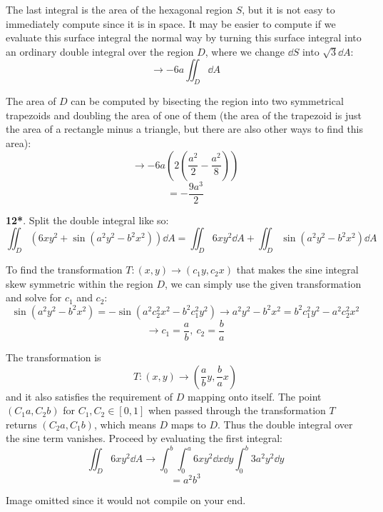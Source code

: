 \documentclass[11pt]{article}
\newcommand{\br}[1]{\left(#1\right)}
\newcommand{\sbr}[1]{\left[#1\right]}
\begin{document}
The last integral is the area of the hexagonal region $S$, but it is not easy to immediately compute since it is in space. It may be easier to compute if we evaluate this surface integral the normal way by turning this surface integral into an ordinary double integral over the region $D$, where we change $\dd{S}$ into $\sqrt{3}\dd{A}$:
$$\to -6a\iint_D\dd{A}$$

The area of $D$ can be computed by bisecting the region into two symmetrical trapezoids and doubling the area of one of them (the area of the trapezoid is just the area of a rectangle minus a triangle, but there are also other ways to find this area):
$$\to -6a\br{2\br{\frac{a^2}{2}-\frac{a^2}{8}}}$$
$$\boxed{=-\frac{9a^3}{2}}$$

\noindent\makebox[\linewidth]{\rule{19.1cm}{0.4pt}}

\textbf{12*}. Split the double integral like so:
$$\iint_D \br{6xy^2 + \sin(a^2y^2-b^2x^2)}\dd{A} = \iint_D 6xy^2\dd{A} + \iint_D \sin(a^2y^2-b^2x^2)\dd{A}$$

To find the transformation $T: (x,y)\to (c_1y,c_2x)$ that makes the sine integral skew symmetric within the region $D$, we can simply use the given transformation and solve for $c_1$ and $c_2$:
$$\sin(a^2y^2 - b^2x^2) = -\sin(a^2c_2^2x^2 - b^2c_1^2y^2) \to a^2y^2-b^2x^2 = b^2c_1^2y^2 - a^2c_2^2x^2$$
$$\to c_1 = \frac{a}{b}, ~c_2 = \frac{b}{a}$$

The transformation is $$T: (x,y)\to \br{\frac{a}{b}y,\frac{b}{a}x}$$ and it also satisfies the requirement of $D$ mapping onto itself. The point $(C_1a,C_2b)$ for $C_1, C_2 \in \sbr{0,1}$ when passed through the transformation $T$ returns $(C_2a,C_1b)$, which means $D$ maps to $D$. Thus the double integral over the sine term vanishes. Proceed by evaluating the first integral:
$$\iint_D 6xy^2\dd{A} \to \int_0^b\int_0^a 6xy^2 \dd{x}\dd{y}\int_0^b 3a^2y^2\dd{y}$$
$$\boxed{= a^2b^3}$$

\noindent\makebox[\linewidth]{\rule{19.1cm}{0.4pt}}

Image omitted since it would not compile on your end.
\end{document}

